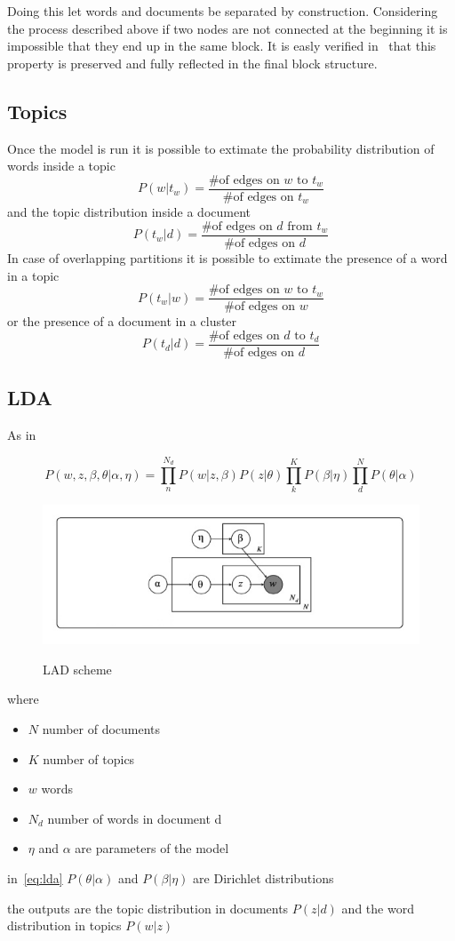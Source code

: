 Doing this let words and documents be separated by construction.
Considering the process described above if two nodes are not connected at the beginning it is impossible
that they end up in the same block.
It is easly verified in~\cite{peixoto2014efficient} that this property is
preserved and fully reflected in the final block structure.

\subsection{Topics}

Once the model is run it is possible to extimate the probability distribution of words inside a topic
\[P(w|t_w)=\frac{\text{\# of edges on $w$ to $t_w$}}{\text{\# of edges on $t_w$}}\]
and the topic distribution inside a document
\[P(t_w|d)=\frac{\text{\# of edges on $d$ from $t_w$}}{\text{\# of edges on $d$}}\]
In case of overlapping partitions it is possible to extimate the presence of a
word in a topic
\[P(t_w|w)=\frac{\text{\# of edges on $w$ to $t_w$}}{\text{\# of edges on $w$}}\]
or the presence of a document in a cluster
\[P(t_d|d)=\frac{\text{\# of edges on $d$ to $t_d$}}{\text{\# of edges on $d$}}\]

\subsection{LDA}
As in ~\cite{Zhou2016}

\begin{equation}\label{eq:lda}
  P(w, z,\beta, \theta| \alpha, \eta)=\prod_n^{N_d} P(w|z,\beta)P(z|\theta)\prod_k^KP(\beta|\eta)\prod_d^N P(\theta | \alpha)
\end{equation}

\begin{figure}
  \centering
  \includegraphics[width=0.5\linewidth]{pictures/topic/LDA.jpeg}
  \label{fig:LDA}
  \caption{LAD scheme}
\end{figure}

where

\begin{itemize}
  \item $N$ number of documents
  \item $K$ number of topics
  \item $w$ words
  \item $N_d$ number of words in document d
  \item $\eta$ and $\alpha$ are parameters of the model
\end{itemize}

in~\ref{eq:lda} $P(\theta | \alpha)$ and $P(\beta|\eta)$ are Dirichlet distributions

the outputs are the topic distribution in documents $P(z|d)$ and the word distribution in topics $P(w|z)$

